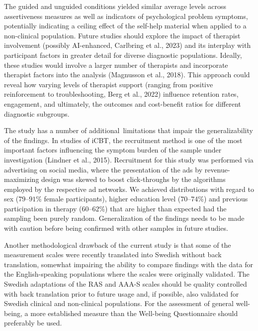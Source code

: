 \documentclass[3p]{elsarticle} %
\begin{document}
\color{newtext}The guided and unguided conditions yielded similar
average levels across assertiveness measures as well as indicators of
psychological problem symptoms, potentially indicating a ceiling effect
of the self-help material when applied to a non-clinical population.
Future studies should explore the impact of therapist involvement
(possibly AI-enhanced, Carlbring et al., 2023) and its interplay with
participant factors in greater detail for diverse diagnostic
populations. Ideally, these studies would involve a larger number of
therapists and incorporate therapist factors into the analysis
(Magnusson et al., 2018). This approach could reveal how varying levels
of therapist support (ranging from positive reinforcement to
troubleshooting, Berg et al., 2022) influence retention rates,
engagement, and ultimately, the outcomes and cost-benefit ratios for
different diagnostic subgroups.\color{oldtext}

The study has a number of
\color{newtext}additional\color{oldtext}~limitations that impair the
generalizability of the findings. In studies of iCBT, the recruitment
method is one of the most important factors influencing the symptom
burden of the sample under investigation (Lindner et al., 2015).
Recruitment for this study was performed via advertising on social
media, where the presentation of the ads by revenue-maximizing design
was skewed to boost click-throughs by the algorithms employed by the
respective ad networks. We achieved distributions with regard to sex
(\(79\)--\(91\)\% female participants), higher education level
(\(70\)--\(74\)\%) and previous participation in therapy
(\(60\)--\(62\)\%) that are higher than expected had the sampling been
purely random. Generalization of the findings needs to be made with
caution before being confirmed with other samples in future studies.

Another methodological drawback of the current study is that some of the
measurement scales were recently translated into Swedish without back
translation, somewhat impairing the ability to compare findings with the
data for the English-speaking populations where the scales were
originally validated. The Swedish adaptations of the RAS and AAA-S
scales should be quality controlled with back translation prior to
future usage and, if possible, also validated for Swedish clinical and
non-clinical populations. For the assessment of general well-being, a
more established measure than the Well-being Questionnaire should
preferably be used.
\end{document}
